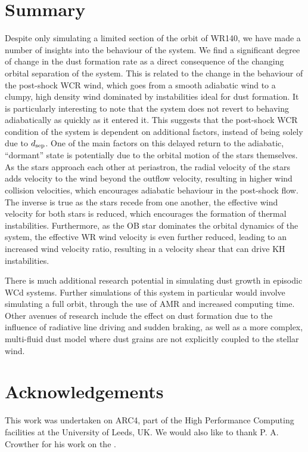 \section{Summary}
\label{sec:p2-conclusion}

Despite only simulating a limited section of the orbit of WR140, we have made a number of insights into the behaviour of the system.
We find a significant degree of change in the dust formation rate as a direct consequence of the changing orbital separation of the system.
This is related to the change in the behaviour of the post-shock WCR wind, which goes from a smooth adiabatic wind to a clumpy, high density wind dominated by instabilities ideal for dust formation.
It is particularly interesting to note that the system does not revert to behaving adiabatically as quickly as it entered it.
This suggests that the post-shock WCR condition of the system is dependent on additional factors, instead of being solely due to $d_\text{sep}$.
One of the main factors on this delayed return to the adiabatic, ``dormant'' state is potentially due to the orbital motion of the stars themselves.
As the stars approach each other at periastron, the radial velocity of the stars adds velocity to the wind beyond the outflow velocity, resulting in higher wind collision velocities, which encourages adiabatic behaviour in the post-shock flow.
The inverse is true as the stars recede from one another, the effective wind velocity for both stars is reduced, which encourages the formation of thermal instabilities.
Furthermore, as the OB star dominates the orbital dynamics of the system, the effective WR wind velocity is even further reduced, leading to an increased wind velocity ratio, resulting in a velocity shear that can drive KH instabilities.

There is much additional research potential in simulating dust growth in episodic WCd systems.
Further simulations of this system in particular would involve simulating a full orbit, through the use of AMR and increased computing time.
Other avenues of research include the effect on dust formation due to the influence of radiative line driving and sudden braking, as well as a more complex, multi-fluid dust model where dust grains are not explicitly coupled to the stellar wind.

\section{Acknowledgements}

This work was undertaken on ARC4, part of the High Performance Computing facilities at the University of Leeds, UK.
We would also like to thank P. A. Crowther for his work on the .